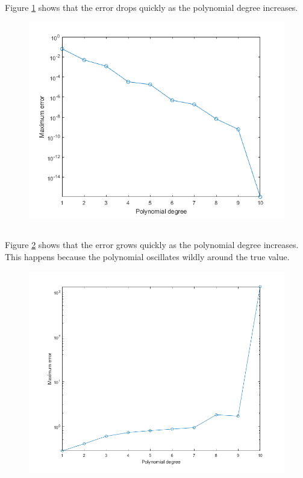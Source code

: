 \documentclass[12pt]{article}
\begin{document}
\subsection{} %

Figure \ref{fig_2a_err} shows that the error drops quickly as the polynomial degree increases.

\begin{figure}
    \includegraphics[width=0.6\linewidth]{plot_err}
    \centering
    \caption{}
    \label{fig_2a_err}
\end{figure}

\subsection{} %

Figure \ref{fig_2b_err} shows that the error grows quickly as the polynomial degree increases. This happens because the polynomial oscillates wildly around the true value.

\begin{figure}
    \includegraphics[width=0.6\linewidth]{odd_plot_err}
    \centering
    \caption{}
    \label{fig_2b_err}
\end{figure}

\subsection{} %
\end{document}
